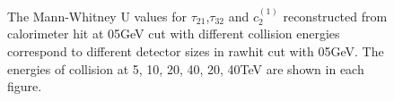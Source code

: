 \begin{figure}
\begin{center}
\end{center}
\caption{The Mann-Whitney U values for $\tau_{21}$,$\tau_{32}$ and $c_2^{(1)}$ reconstructed from calorimeter hit at 05GeV cut with different collision energies correspond to different detector sizes in rawhit cut with 05GeV. The energies of collision at 5, 10, 20, 40, 20, 40TeV are shown in each figure.}
\label{fig:Rawhit_05GeV_total_Mann}
\end{figure}



